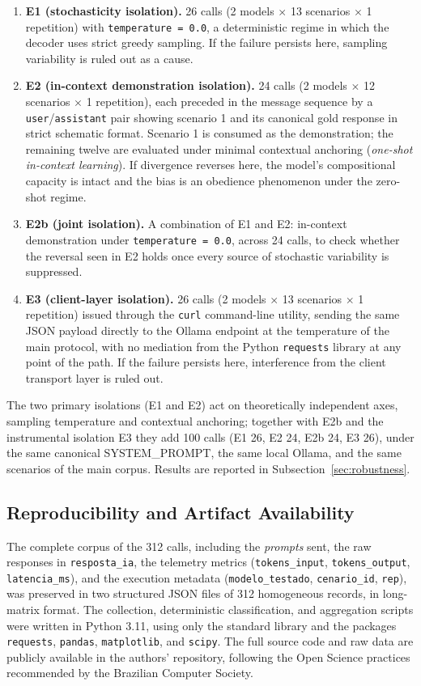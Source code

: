 \documentclass{sbc2023}%
\begin{document}
\begin{enumerate}
\item \textbf{E1 (stochasticity isolation).} 26 calls (2 models $\times$ 13 scenarios $\times$ 1 repetition) with \texttt{temperature = 0.0}, a deterministic regime in which the decoder uses strict greedy sampling. If the failure persists here, sampling variability is ruled out as a cause.
\item \textbf{E2 (in-context demonstration isolation).} 24 calls (2 models $\times$ 12 scenarios $\times$ 1 repetition), each preceded in the message sequence by a \texttt{user}/\texttt{assistant} pair showing scenario 1 and its canonical gold response in strict schematic format. Scenario 1 is consumed as the demonstration; the remaining twelve are evaluated under minimal contextual anchoring (\textit{one-shot in-context learning}). If divergence reverses here, the model's compositional capacity is intact and the bias is an obedience phenomenon under the zero-shot regime.
\item \textbf{E2b (joint isolation).} A combination of E1 and E2: in-context demonstration under \texttt{temperature = 0.0}, across 24 calls, to check whether the reversal seen in E2 holds once every source of stochastic variability is suppressed.
\item \textbf{E3 (client-layer isolation).} 26 calls (2 models $\times$ 13 scenarios $\times$ 1 repetition) issued through the \texttt{curl} command-line utility, sending the same JSON payload directly to the Ollama endpoint at the temperature of the main protocol, with no mediation from the Python \texttt{requests} library at any point of the path. If the failure persists here, interference from the client transport layer is ruled out.
\end{enumerate}

The two primary isolations (E1 and E2) act on theoretically independent axes, sampling temperature and contextual anchoring; together with E2b and the instrumental isolation E3 they add 100 calls (E1 26, E2 24, E2b 24, E3 26), under the same canonical SYSTEM\_PROMPT, the same local Ollama, and the same scenarios of the main corpus. Results are reported in Subsection~\ref{sec:robustness}.

\subsection{Reproducibility and Artifact Availability}

The complete corpus of the 312 calls, including the \textit{prompts} sent, the raw responses in \texttt{resposta\_ia}, the telemetry metrics (\texttt{tokens\_input}, \texttt{tokens\_output}, \texttt{latencia\_ms}), and the execution metadata (\texttt{modelo\_testado}, \texttt{cenario\_id}, \texttt{rep}), was preserved in two structured JSON files of 312 homogeneous records, in long-matrix format. The collection, deterministic classification, and aggregation scripts were written in Python 3.11, using only the standard library and the packages \texttt{requests}, \texttt{pandas}, \texttt{matplotlib}, and \texttt{scipy}. The full source code and raw data are publicly available in the authors' repository, following the Open Science practices recommended by the Brazilian Computer Society.
\end{document}
